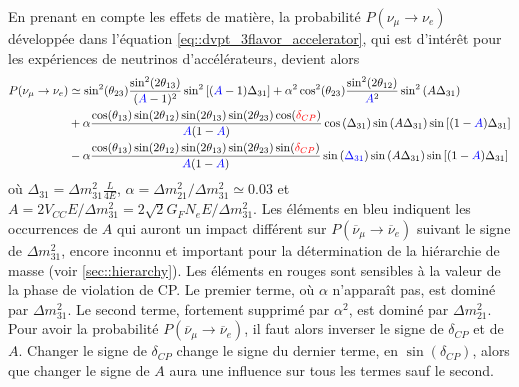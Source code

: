             En prenant en compte les effets de matière, la probabilité $P(\nu_{\mu}\to\nu_e)$ développée dans l'équation \eqref{eq::dvpt_3flavor_accelerator}, qui est d'intérêt pour les expériences de neutrinos d'accélérateurs, devient alors\cite{Giganti2017}
            \begin{equation}\label{eq::proba_matter_3flavors}
	            \begin{split}
	            P(\nu_{\mu}\to\nu_e) & \simeq  \sin^2(\theta_{23})\frac{\sin^2(2\theta_{13})}{(\textcolor{blue}{A}-1)^2}\sin^2\left[(\textcolor{blue}{A}-1)\Delta_{31}\right]
	            + \alpha^2\cos^2(\theta_{23})\frac{\sin^2(2\theta_{12})}{\textcolor{blue}{A}^2}\sin^2\left(A\Delta_{31}\right) \\ 
	            & + \alpha\frac{\cos(\theta_{13})\sin(2\theta_{12})\sin(2\theta_{13})\sin(2\theta_{23})\cos(\textcolor{red}{\delta_{CP}})}{\textcolor{blue}{A}(1-\textcolor{blue}{A})}\cos\left(\Delta_{31}\right)\sin\left(A\Delta_{31}\right)\sin\left[(1-\textcolor{blue}{A})\Delta_{31}\right] \\
	            & - \alpha\frac{\cos(\theta_{13})\sin(2\theta_{12})\sin(2\theta_{13})\sin(2\theta_{23})\sin(\textcolor{red}{\delta_{CP}})}{\textcolor{blue}{A}(1-\textcolor{blue}{A})}\sin\left(\textcolor{blue}{\Delta_{31}}\right)\sin\left(A\Delta_{31}\right)\sin\left[(1-\textcolor{blue}{A})\Delta_{31}\right]
	            \end{split}
            \end{equation}
            où $\Delta_{31}=\Delta m^2_{31}\frac{L}{4E}$, $\alpha=\Delta m^2_{21}/\Delta m^2_{31}\simeq 0.03$  et $A=2V_{CC}E/\Delta m^2_{31}=2\sqrt{2}G_F N_eE/\Delta m^2_{31}$. Les éléments en bleu indiquent les occurrences de $A$ qui auront un impact différent sur $P(\overline{\nu}_{\mu}\to\overline{\nu}_e)$ suivant le signe de $\Delta m^2_{31}$, encore inconnu et important pour la détermination de la hiérarchie de masse (voir \autoref{sec::hierarchy}). Les éléments en rouges sont sensibles à la valeur de la phase de violation de CP. Le premier terme, où $\alpha$ n'apparaît pas, est dominé par $\Delta m^2_{31}$. Le second terme, fortement supprimé par $\alpha^2$, est dominé par $\Delta m^2_{21}$. Pour avoir la probabilité $P(\overline{\nu}_{\mu}\to\overline{\nu}_e)$, il faut alors inverser le signe de $\delta_{CP}$ et de $A$. Changer le signe de $\delta_{CP}$ change le signe du dernier terme, en $\sin(\delta_{CP})$, alors que changer le signe de $A$ aura une influence sur tous les termes sauf le second.
            

